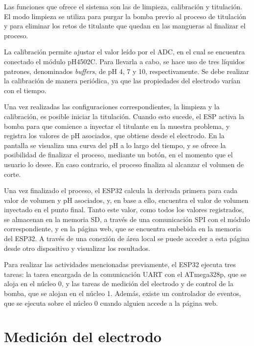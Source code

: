 Las funciones que ofrece el sistema son las de limpieza, calibración y titulación. El modo limpieza se utiliza para purgar la bomba previo al proceso de titulación y para eliminar los retos de titulante que quedan en las mangueras al finalizar el proceso. 

La calibración permite ajustar el valor leído por el ADC, en el cual se encuentra conectado el módulo pH4502C. Para llevarla a cabo, se hace uso de tres líquidos patrones, denominados \textit{buffers}, de pH 4, 7 y 10, respectivamente. Se debe realizar la calibración de manera periódica, ya que las propiedades del electrodo varían con el tiempo.

Una vez realizadas las configuraciones correspondientes, la limpieza y la calibración, es posible iniciar la titulación. Cuando esto sucede, el ESP activa  la bomba para que comience a inyectar el titulante en la muestra problema, y registra los valores de pH asociados, que obtiene desde el electrodo. En la pantalla se visualiza una curva del pH a lo largo del tiempo, y se ofrece la posibilidad de finalizar el proceso, mediante un botón, en el momento que el usuario lo desee. En caso contrario, el proceso finaliza al alcanzar el volumen de corte.

Una vez finalizado el proceso, el ESP32 calcula la derivada primera para cada valor de volumen y pH asociados, y, en base a ello, encuentra el valor de volumen inyectado en el punto final. Tanto este valor, como todos los valores registrados, se almacenan en la memoria SD, a través de una comunicación SPI con el módulo correspondiente, y en la página web, que se encuentra embebida en la memoria del ESP32. A través de una conexión de área local se puede acceder a esta página desde otro dispositivo y visualizar los resultados.

Para realizar las actividades mencionadas previamente, el ESP32 ejecuta tres tareas: la tarea encargada de la comunicación UART con el ATmega328p, que se aloja en el núcleo 0, y las tareas de medición del electrodo y de control de la bomba, que se alojan en el núcleo 1. Además, existe un controlador de eventos, que se ejecuta sobre el núcleo 0 cuando alguien accede a la página web.


\section{Medición del electrodo}

